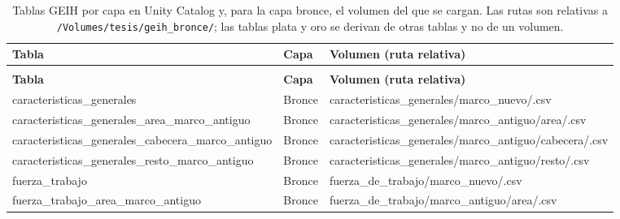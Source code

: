     \small
    \begin{longtable}{
        >{\raggedright\arraybackslash\ttfamily\footnotesize}p{6.0cm}
        >{\centering\arraybackslash}p{1.4cm}
        >{\raggedright\arraybackslash\ttfamily\footnotesize}p{5.6cm}
    }
    \caption{Tablas GEIH por capa en Unity Catalog y, para la capa bronce, el volumen del que se
    cargan. Las rutas son relativas a \texttt{/Volumes/tesis/geih\_bronce/}; las tablas plata y oro
    se derivan de otras tablas y no de un volumen.}
    \label{tab:tablas_geih_capa} \\
    \toprule
    \normalfont\textbf{Tabla} & \normalfont\textbf{Capa} & \normalfont\textbf{Volumen (ruta relativa)} \\
    \midrule
    \endfirsthead
    \multicolumn{3}{c}{\tablename\ \thetable{} (continuación)} \\
    \toprule
    \normalfont\textbf{Tabla} & \normalfont\textbf{Capa} & \normalfont\textbf{Volumen (ruta relativa)} \\
    \midrule
    \endhead
    \bottomrule
    \endfoot
    \bottomrule
    \endlastfoot
    caracteristicas\_\allowbreak generales & Bronce &
        caracteristicas\_\allowbreak generales/\allowbreak marco\_\allowbreak nuevo/\allowbreak *.csv \\
    caracteristicas\_\allowbreak generales\_\allowbreak area\_\allowbreak marco\_\allowbreak antiguo & Bronce &
        caracteristicas\_\allowbreak generales/\allowbreak marco\_\allowbreak antiguo/\allowbreak area/\allowbreak *.csv \\
    caracteristicas\_\allowbreak generales\_\allowbreak cabecera\_\allowbreak marco\_\allowbreak antiguo & Bronce &
        caracteristicas\_\allowbreak generales/\allowbreak marco\_\allowbreak antiguo/\allowbreak cabecera/\allowbreak *.csv \\
    caracteristicas\_\allowbreak generales\_\allowbreak resto\_\allowbreak marco\_\allowbreak antiguo & Bronce &
        caracteristicas\_\allowbreak generales/\allowbreak marco\_\allowbreak antiguo/\allowbreak resto/\allowbreak *.csv \\
    fuerza\_\allowbreak trabajo & Bronce &
        fuerza\_\allowbreak de\_\allowbreak trabajo/\allowbreak marco\_\allowbreak nuevo/\allowbreak *.csv \\
    fuerza\_\allowbreak trabajo\_\allowbreak area\_\allowbreak marco\_\allowbreak antiguo & Bronce &
        fuerza\_\allowbreak de\_\allowbreak trabajo/\allowbreak marco\_\allowbreak antiguo/\allowbreak area/\allowbreak *.csv \\

\end{longtable}
